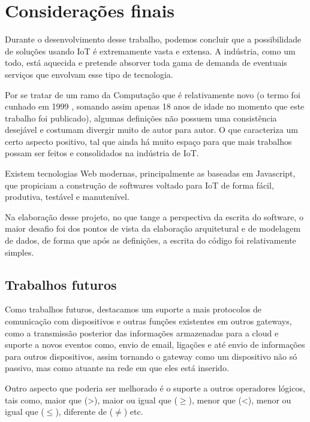 \section{Considerações finais}

Durante o desenvolvimento desse trabalho, podemos concluir que a possibilidade de soluções usando IoT é extremamente vasta e extensa. A indústria, como um todo, está aquecida e pretende absorver toda gama de demanda de eventuais serviços que envolvam esse tipo de tecnologia.

Por se tratar de um ramo da Computação que é relativamente novo (o termo foi cunhado em 1999 \cite{Kevin}, somando assim apenas 18 anos de idade no momento que este trabalho foi publicado), algumas definições não possuem uma consistência desejável e costumam divergir muito de autor para autor. O que caracteriza um certo aspecto positivo, tal que ainda há muito espaço para que mais trabalhos possam ser feitos e consolidados na indústria de IoT.

Existem tecnologias Web modernas, principalmente as baseadas em Javascript, que propiciam a construção de softwares voltado para IoT de forma fácil, produtiva, testável e manutenível.

Na elaboração desse projeto, no que tange a perspectiva da escrita do software, o maior desafio foi dos pontos de vista da elaboração arquitetural e de modelagem de dados, de forma que após as definições, a escrita do código foi relativamente simples.

\subsection{Trabalhos futuros}
\label{trabalhosFuturos}

Como trabalhos futuros, destacamos um suporte a mais protocolos de comunicação com dispositivos e outras funções existentes em outros gateways, como a transmissão posterior das informações armazenadas para a cloud e suporte a novos eventos como, envio de email, ligações e até envio de informações para outros dispositivos, assim tornando o gateway como um dispositivo não só passivo, mas como atuante na rede em que eles está inserido.


Outro aspecto que poderia ser melhorado é o suporte a outros operadores lógicos, tais como, maior que (>), maior ou igual que (\begin{math} \geq \end{math}), menor que (<), menor ou igual que (\begin{math} \leq \end{math}), diferente de (\begin{math}\ne\end{math}) etc.



